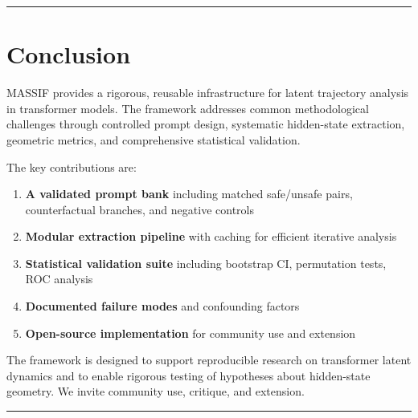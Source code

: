 \documentclass[12pt,a4paper]{article}
\begin{document}
\medskip
\hrule
\medskip

\section{Conclusion}

MASSIF provides a rigorous, reusable infrastructure for latent trajectory analysis in transformer models. The framework addresses common methodological challenges through controlled prompt design, systematic hidden-state extraction, geometric metrics, and comprehensive statistical validation.

The key contributions are:

\begin{enumerate}
    \item \textbf{A validated prompt bank} including matched safe/unsafe pairs, counterfactual branches, and negative controls
    \item \textbf{Modular extraction pipeline} with caching for efficient iterative analysis
    \item \textbf{Statistical validation suite} including bootstrap CI, permutation tests, ROC analysis
    \item \textbf{Documented failure modes} and confounding factors
    \item \textbf{Open-source implementation} for community use and extension
\end{enumerate}

The framework is designed to support reproducible research on transformer latent dynamics and to enable rigorous testing of hypotheses about hidden-state geometry. We invite community use, critique, and extension.

\medskip
\hrule
\medskip
\end{document}
